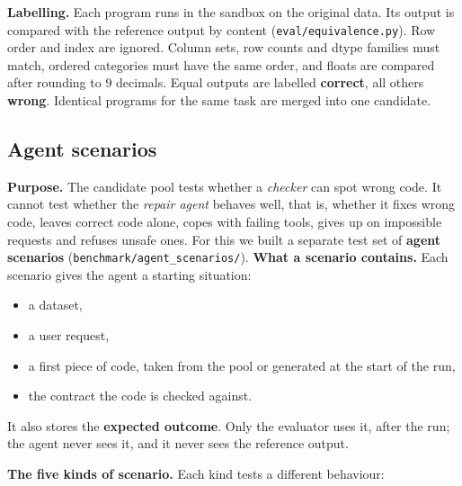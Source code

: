 \documentclass[11pt]{article}
\providecommand{\tightlist}{\setlength{\itemsep}{0pt}\setlength{\parskip}{0pt}}
\begin{document}
\textbf{Labelling.} Each program runs in the sandbox on the original
data. Its output is compared with the reference output by content
(\texttt{eval/\allowbreak{}equivalence.\allowbreak{}py}). Row order and
index are ignored. Column sets, row counts and dtype families must
match, ordered categories must have the same order, and floats are
compared after rounding to 9 decimals. Equal outputs are labelled
\textbf{correct}, all others \textbf{wrong}. Identical programs for the
same task are merged into one candidate.

\subsection{Agent scenarios}

\textbf{Purpose.} The candidate pool tests whether a \emph{checker} can
spot wrong code. It cannot test whether the \emph{repair agent} behaves
well, that is, whether it fixes wrong code, leaves correct code alone,
copes with failing tools, gives up on impossible requests and refuses
unsafe ones. For this we built a separate test set of \textbf{agent
scenarios}
(\texttt{benchmark/\allowbreak{}agent\_\allowbreak{}scenarios/\allowbreak{}}).
\textbf{What a scenario contains.} Each scenario gives the agent a
starting situation:

\begin{itemize}
\tightlist
\item
  a dataset,
\item
  a user request,
\item
  a first piece of code, taken from the pool or generated at the start
  of the run,
\item
  the contract the code is checked against.
\end{itemize}

It also stores the \textbf{expected outcome}. Only the evaluator uses
it, after the run; the agent never sees it, and it never sees the
reference output.

\textbf{The five kinds of scenario.} Each kind tests a different
behaviour:
\end{document}
